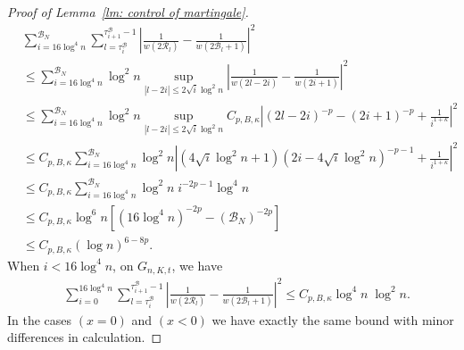 \documentclass[EJP]{ejpecp} %
\begin{document}
\begin{proof}[Proof of Lemma~\ref{lm: control of martingale}]
\begin{align*}
		&\sum_{i = 16 \log^4 n}^{\mathscr{B}_N} \sum_{l = \tau_i^{\mathscr{B}}}^{\tau_{i+1}^{\mathscr{B}}-1} 
		\left| \frac{1}{w(2 \mathscr{R}_l)} - \frac{1}{w\left( 2 \mathscr{B}_l + 1 \right) } \right|^2 \\
		&\leq \sum_{i = 16 \log^4 n}^{\mathscr{B}_N} \log^2 n \sup_{|l - 2 i| \le 2 \sqrt{i} \log^2 n} 
		\left| \frac{1}{w(2 l - 2 i)} - \frac{1}{w\left(2 i + 1 \right) } \right|^2 \\
		&\leq \sum_{i = 16 \log^4 n}^{\mathscr{B}_N} \log^2 n \sup_{|l - 2 i| \le 2 \sqrt{i} \log^2 n} 
		C_{p, B, \kappa} \left| (2 l - 2 i)^{-p} - (2 i + 1)^{-p} + \frac{1}{i^{1 + \kappa}} \right|^2 \\
		&\leq C_{p, B, \kappa} \sum_{i = 16 \log^4 n}^{\mathscr{B}_N} \log^2 n  
		 \left| (4 \sqrt{i} \log^2 n + 1)(2 i - 4 \sqrt{i} \log^2 n)^{- p - 1} + \frac{1}{i^{1 + \kappa}} \right|^2 \\
		&\leq C_{p, B, \kappa} \sum_{i = 16 \log^4 n}^{\mathscr{B}_N} \log^2 n \; i^{- 2 p - 1} \log^4 n \\
		&\leq C_{p, B, \kappa} \log^6 n 
			\left[(16 \log^4 n)^{- 2 p} - (\mathscr{B}_N)^{-2p}\right] \\
		&\leq C_{p, B, \kappa} (\log n)^{6 - 8 p}
		.
	\end{align*}
	When $i < 16 \log^4 n$, on $G_{n, K, t}$, we have
	\begin{align*}
		&\sum_{i = 0}^{16 \log^4 n} \sum_{l = \tau_i^{\mathscr{B}}}^{\tau_{i+1}^{\mathscr{B}}-1} 
		\left| \frac{1}{w(2 \mathscr{R}_l)} - \frac{1}{w\left( 2 \mathscr{B}_l + 1 \right) } \right|^2 
		\leq C_{p, B, \kappa} \log^4 n \; \log^2 n
		.
	\end{align*}
	In the cases $(x=0)$ and $(x < 0)$ we have exactly the same bound with minor differences in calculation.


\end{proof}
\end{document}
